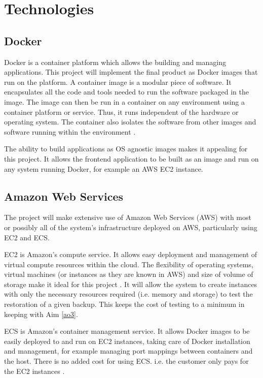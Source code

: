 \section{Technologies}

\subsection{Docker}
Docker is a container platform which allows the building and managing applications. This project will implement the final product as Docker images that run on the platform. A container image is a modular piece of software. It encapsulates all the code and tools needed to run the software packaged in the image. The image can then be run in a container on any environment using a container platform or service. Thus, it runs independent of the hardware or operating system. The container also isolates the software from other images and software running within the environment \citep{docker}.

The ability to build applications as OS agnostic images makes it appealing for this project. It allows the frontend application to be built as an image and run on any system running Docker, for example an AWS EC2 instance. 


\subsection{Amazon Web Services}
The project will make extensive use of Amazon Web Services (AWS) with most or possibly all of the system's infrastructure deployed on AWS, particularly using EC2 and ECS.

EC2 is Amazon's compute service. It allows easy deployment and management of virtual compute resources within the cloud. The flexibility of operating systems, virtual machines (or instances as they are known in AWS) and size of volume of storage make it ideal for this project \citep{ec2}. It will allow the system to create instances with only the necessary resources required (i.e. memory and storage) to test the restoration of a given backup. This keeps the cost of testing to a minimum in keeping with Aim \ref{ao3}.

ECS is Amazon's container management service. It allows Docker images to be easily deployed to and run on  EC2 instances, taking care of Docker installation and management, for example managing port mappings between containers and the host. There is no added cost for using ECS. i.e. the customer only pays for the EC2 instances \citep{ecs}. 

